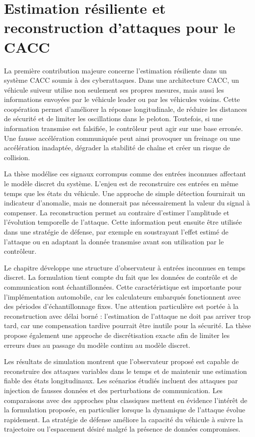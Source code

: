 \section*{Estimation résiliente et reconstruction d'attaques pour le CACC}

La première contribution majeure concerne l'estimation résiliente dans un système CACC soumis à des cyberattaques. Dans une architecture CACC, un véhicule suiveur utilise non seulement ses propres mesures, mais aussi les informations envoyées par le véhicule leader ou par les véhicules voisins. Cette coopération permet d'améliorer la réponse longitudinale, de réduire les distances de sécurité et de limiter les oscillations dans le peloton. Toutefois, si une information transmise est falsifiée, le contrôleur peut agir sur une base erronée. Une fausse accélération communiquée peut ainsi provoquer un freinage ou une accélération inadaptée, dégrader la stabilité de chaîne et créer un risque de collision.

La thèse modélise ces signaux corrompus comme des entrées inconnues affectant le modèle discret du système. L'enjeu est de reconstruire ces entrées en même temps que les états du véhicule. Une approche de simple détection fournirait un indicateur d'anomalie, mais ne donnerait pas nécessairement la valeur du signal à compenser. La reconstruction permet au contraire d'estimer l'amplitude et l'évolution temporelle de l'attaque. Cette information peut ensuite être utilisée dans une stratégie de défense, par exemple en soustrayant l'effet estimé de l'attaque ou en adaptant la donnée transmise avant son utilisation par le contrôleur.

Le chapitre développe une structure d'observateur à entrées inconnues en temps discret. La formulation tient compte du fait que les données de contrôle et de communication sont échantillonnées. Cette caractéristique est importante pour l'implémentation automobile, car les calculateurs embarqués fonctionnent avec des périodes d'échantillonnage fixes. Une attention particulière est portée à la reconstruction avec délai borné : l'estimation de l'attaque ne doit pas arriver trop tard, car une compensation tardive pourrait être inutile pour la sécurité. La thèse propose également une approche de discrétisation exacte afin de limiter les erreurs dues au passage du modèle continu au modèle discret.

Les résultats de simulation montrent que l'observateur proposé est capable de reconstruire des attaques variables dans le temps et de maintenir une estimation fiable des états longitudinaux. Les scénarios étudiés incluent des attaques par injection de fausses données et des perturbations de communication. Les comparaisons avec des approches plus classiques mettent en évidence l'intérêt de la formulation proposée, en particulier lorsque la dynamique de l'attaque évolue rapidement. La stratégie de défense améliore la capacité du véhicule à suivre la trajectoire ou l'espacement désiré malgré la présence de données compromises.

